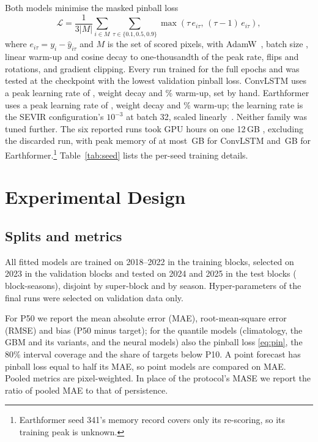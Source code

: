 \documentclass[journal]{IEEEtran}
\begin{document}
Both models minimise the masked pinball loss
\begin{equation}
\mathcal{L}=\frac{1}{3|M|}\sum_{i\in M}\sum_{\tau\in\{0.1,0.5,0.9\}}\max\left(\tau\,e_{i\tau},\,(\tau-1)\,e_{i\tau}\right),
\label{eq:pin}
\end{equation}
where $e_{i\tau}=y_i-\hat y_{i\tau}$ and $M$ is the set of scored pixels, with AdamW~\cite{adamw}, batch size \finxConvLSTMBS, linear warm-up and cosine decay to one-thousandth of the peak rate, flips and rotations, and gradient clipping. Every run trained for the full \finxEpochBudget{} epochs and was tested at the checkpoint with the lowest validation pinball loss. ConvLSTM uses a peak learning rate of \finyConvLSTMLR, weight decay \finyConvLSTMWD{} and \finxConvLSTMWarmup\% warm-up, set by hand. Earthformer uses a peak learning rate of \finyEarthformerLR, weight decay \finyEarthformerWD{} and \finxEarthformerWarmup\% warm-up; the learning rate is the SEVIR configuration's $10^{-3}$ at batch 32, scaled linearly~\cite{goyal}. Neither family was tuned further. The six reported runs took \finxNeuralTrainHours{} GPU hours on one 12\,GB \finxGPU, excluding the discarded run, with peak memory of at most \finxConvLSTMPeakGpuMax\,GB for ConvLSTM and \finxEarthformerPeakGpuMax\,GB for Earthformer.\footnote{Earthformer seed 341's memory record covers only its re-scoring, so its training peak is unknown.} Table~\ref{tab:seed} lists the per-seed training details.

\section{Experimental Design}
\subsection{Splits and metrics}
All fitted models are trained on 2018--2022 in the training blocks, selected on 2023 in the validation blocks and tested on 2024 and 2025 in the test blocks (\finxNTestBlockSeasons{} block-seasons), disjoint by super-block and by season. Hyper-parameters of the final runs were selected on validation data only.

For P50 we report the mean absolute error (MAE), root-mean-square error (RMSE) and bias (P50 minus target); for the quantile models (climatology, the GBM and its variants, and the neural models) also the pinball loss \eqref{eq:pin}, the 80\% interval coverage and the share of targets below P10. A point forecast has pinball loss equal to half its MAE, so point models are compared on MAE. Pooled metrics are pixel-weighted. In place of the protocol's MASE we report the ratio of pooled MAE to that of persistence.
\end{document}
